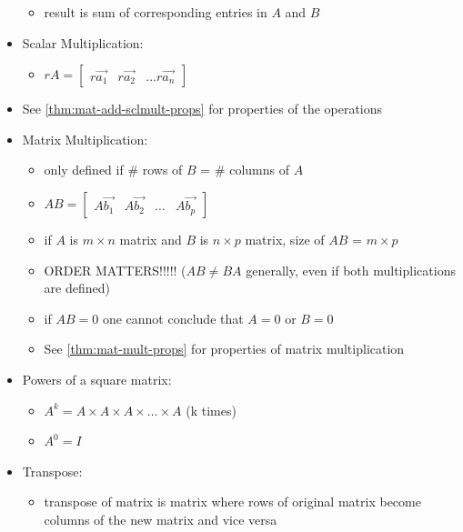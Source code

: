 \documentclass[a4paper,12pt]{article}
\theoremstyle{definition}
\theoremstyle{definition}
\begin{document}
\begin{itemize}
\begin{itemize}
			\item result is sum of corresponding entries in $A$ and $B$
		\end{itemize}
		
		\item Scalar Multiplication: 
		\begin{itemize}
			\item $rA =
			\begin{bmatrix}
				r\vec{a_1} & r\vec{a_2} & \ldots r\vec{a_n}
			\end{bmatrix}$
		\end{itemize}
		
		\item See \autoref{thm:mat-add-sclmult-props} for properties of the operations
		
		\item Matrix Multiplication:
		\begin{itemize}
			\item only defined if \# rows of $B$ = \# columns of $A$
			
			\item $AB =
			\begin{bmatrix}
				A\vec{b_1} & A\vec{b_2} & \ldots & A\vec{b_p}
			\end{bmatrix}$
			
			\item if $A$ is $m \times n$ matrix and $B$ is $n \times p$ matrix, size of $AB$ = $m \times p$
			
			\item ORDER MATTERS!!!!! ($AB \neq BA$ generally, even if both multiplications are defined)
			
			\item if $AB = 0$ one cannot conclude that $A = 0$ or $B = 0$
			
			\item See \autoref{thm:mat-mult-props} for properties of matrix multiplication
		\end{itemize}
		
		\item Powers of a square matrix:
		\begin{itemize}
			\item $A^k = A \times A \times A \times \ldots \times A$ (k times)
			
			\item $A^0 = I$
		\end{itemize}
		
		\item Transpose:
		\begin{itemize}
			\item transpose of matrix is matrix where rows of original matrix become columns of the new matrix and vice versa
			

\end{itemize}
\end{itemize}
\end{document}
